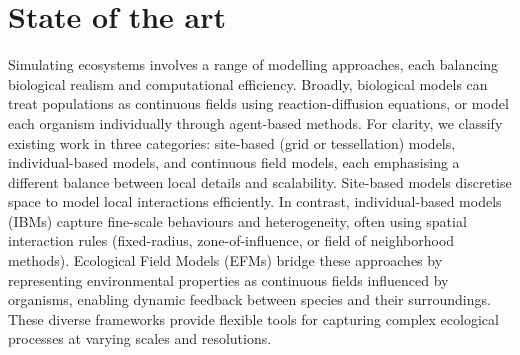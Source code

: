 













\section{State of the art}
\label{sec:env-obj-related-works}

Simulating ecosystems involves a range of modelling approaches, each balancing biological realism and computational efficiency. Broadly, biological models can treat populations as continuous fields using reaction-diffusion equations, or model each organism individually through agent-based methods. For clarity, we classify existing work in three categories: site-based (grid or tessellation) models, individual-based models, and continuous field models, each emphasising a different balance between local details and scalability. Site-based models discretise space to model local interactions efficiently. In contrast, individual-based models (IBMs) capture fine-scale behaviours and heterogeneity, often using spatial interaction rules (fixed-radius, zone-of-influence, or field of neighborhood methods). Ecological Field Models (EFMs) bridge these approaches by representing environmental properties as continuous fields influenced by organisms, enabling dynamic feedback between species and their surroundings. These diverse frameworks provide flexible tools for capturing complex ecological processes at varying scales and resolutions.


